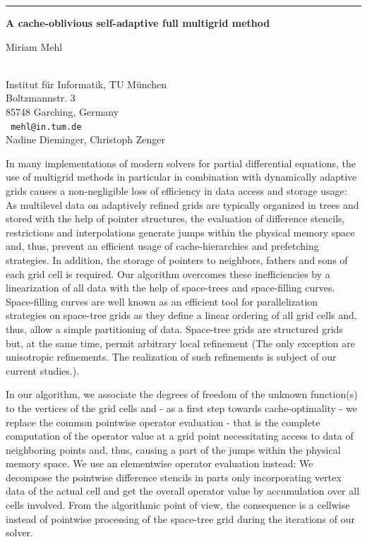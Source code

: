 \documentclass[twosided]{report}
\begin{document}
\begin{center} \rule{6in}{1pt} \end{center}
\newpage	%


\begin{center}
{\large			\label{mehl}
{\bf
A cache-oblivious self-adaptive full multigrid method
}

Miriam Mehl} \\
Institut f\"{u}r Informatik, TU M\"{u}nchen \\
Boltzmannstr. 3 \\
85748 Garching, Germany
\\ {\tt
mehl@in.tum.de
}
\\
Nadine Dieminger,
Christoph Zenger
\end{center}

In many implementations of modern solvers for partial differential
equations, the use of multigrid methods in particular in combination
with dynamically adaptive grids causes a non-negligible loss of
efficiency in data access and storage usage: As multilevel data on
adaptively refined grids are typically organized in trees and stored
with the help of pointer structures, the evaluation of difference
stencils, restrictions and interpolations generate jumps within the
physical memory space and, thus, prevent an efficient usage of
cache-hierarchies and prefetching strategies. In addition, the storage
of pointers to neighbors, fathers and sons of each grid cell is
required. Our algorithm overcomes these inefficiencies by a
linearization of all data with the help of space-trees and
space-filling curves. Space-filling curves are well known as an
efficient tool for parallelization strategies on space-tree grids as
they define a linear ordering of all grid cells and, thus, allow a
simple partitioning of data. Space-tree grids are structured grids but,
at the same time, permit arbitrary local refinement (The only exception
are unisotropic refinements. The realization of such refinements is
subject of our current studies.).

In our algorithm, we associate the degrees of freedom of the unknown
function(s) to the vertices of the grid cells and - as a first step
towards cache-optimality - we replace the common pointwise operator
evaluation - that is the complete computation of the operator value at
a grid point necessitating access to data of neighboring points and,
thus, causing a part of the jumps within the physical memory space. We
use an elementwise operator evaluation instead: We decompose the
pointwise difference stencils in parts only incorporating vertex data
of the actual cell and get the overall operator value by accumulation
over all cells involved. From the algorithmic point of view, the
consequence is a cellwise instead of pointwise processing of the
space-tree grid during the iterations of our solver.
\end{document}
